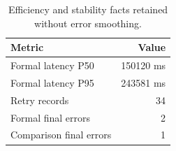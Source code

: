 \begin{table}[t]
\centering
\caption{Efficiency and stability facts retained without error smoothing.}
\label{tab:efficiency}
\begin{tabular}{lr}
\toprule Metric & Value \\
\midrule
Formal latency P50 & 150120 ms \\
Formal latency P95 & 243581 ms \\
Retry records & 34 \\
Formal final errors & 2 \\
Comparison final errors & 1 \\
\bottomrule
\end{tabular}
\end{table}
